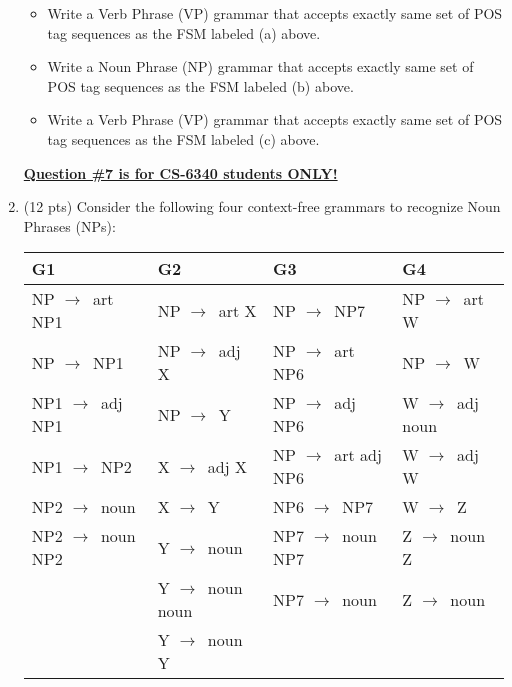 \documentclass[11pt]{article}
\newcommand{\ra}{$\rightarrow$~}
\begin{document}
\begin{enumerate}
 \begin{center}
 \end{center}
\vspace*{.1in}


\begin{itemize}

\item Write a Verb Phrase (VP) grammar that accepts exactly same set
  of POS tag sequences as the FSM labeled (a) above.  \\

\item Write a Noun Phrase (NP) grammar that accepts exactly same set
  of POS tag sequences as the FSM labeled (b) above.  \\

\item Write a Verb Phrase (VP) grammar that accepts exactly same set
  of POS tag sequences as the FSM labeled (c) above.  \\

\end{itemize}



\newpage

\underline{\textbf{Question \#7 is for CS-6340 students ONLY!}}  \\

\item (12 pts) Consider the following four context-free grammars to
  recognize Noun Phrases (NPs):

\begin{center}
\begin{tabular}{|l|l|l|l|} \hline
{\bf G1} & {\bf G2} & {\bf G3} & {\bf G4} \\ \hline
NP \ra art NP1   & NP \ra art X    & NP \ra NP7         & NP \ra art W \\
NP \ra NP1       & NP \ra adj X    & NP \ra art NP6     & NP \ra W \\
NP1 \ra adj NP1  & NP \ra Y        & NP \ra adj NP6     & W \ra adj noun \\
NP1 \ra NP2      & X \ra adj X     & NP \ra art adj NP6 & W \ra adj W \\
NP2 \ra noun     & X \ra Y         & NP6 \ra NP7        & W \ra Z \\
NP2 \ra noun NP2 & Y \ra noun      & NP7 \ra noun NP7   & Z \ra noun Z \\
~                & Y \ra noun noun & NP7 \ra noun       & Z \ra noun \\
~                & Y \ra noun Y    & ~                  & ~        \\ \hline
\end{tabular}
\end{center}


\end{enumerate}
\end{document}
